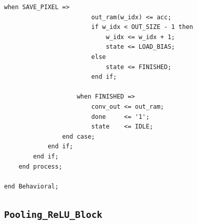 \documentclass[a4paper,12pt]{article}
\begin{document}
\begin{lstlisting}[style=vhdlstyle,
    caption={C\'odigo VHDL do \texttt{Conv1D\_Block}.},
    label={lst:conv1d}]
                    when SAVE_PIXEL =>
                        out_ram(w_idx) <= acc;
                        if w_idx < OUT_SIZE - 1 then
                            w_idx <= w_idx + 1;
                            state <= LOAD_BIAS;
                        else
                            state <= FINISHED;
                        end if;

                    when FINISHED =>
                        conv_out <= out_ram;
                        done     <= '1';
                        state    <= IDLE;
                end case;
            end if;
        end if;
    end process;

end Behavioral;
\end{lstlisting}

\subsection{\texttt{Pooling\_ReLU\_Block}}
\end{document}
